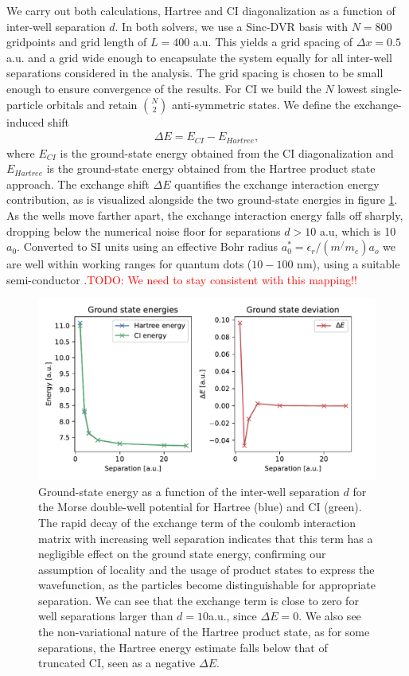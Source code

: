 \documentclass{subfiles}
\begin{document}
We carry out both calculations, Hartree and CI diagonalization as a function of inter-well separation $d$. In both solvers, we use a Sinc-DVR basis with $N=800$ gridpoints and  grid length of $L=400$ a.u. This yields a grid spacing of $\Delta x = 0.5$ a.u. and a grid wide enough to encapsulate the system equally for all inter-well separations considered in the analysis. The grid spacing is chosen to be small enough to ensure convergence of the results. For CI we build the $N$ lowest single-particle orbitals and retain $\binom{N}{2}$ anti-symmetric states. We define the exchange-induced shift
\begin{align*}
    \Delta E = E_{CI} - E_{Hartree},
\end{align*}
where $E_{CI}$ is the ground-state energy obtained from the CI diagonalization and $E_{Hartree}$ is the ground-state energy obtained from the Hartree product state approach. The exchange shift $\Delta E$ quantifies the exchange interaction energy contribution, as is visualized alongside the two ground-state energies in figure \ref{fig:exchange_shift}. As the wells move farther apart, the exchange interaction energy falls off sharply, dropping below the numerical noise floor for separations $d > 10$ a.u, which is 10 $a_0$. Converted to SI units using an effective Bohr radius $a_0^* = \epsilon_r/(m^/m_e)a_o$ we are well within working ranges for quantum dots ($10-100$ nm), using a suitable semi-conductor \cite{jacak2013quantum, garcia2021semiconductor}.\textcolor{red}{TODO: We need to stay consistent with this mapping!!}
\begin{figure}[h!]
    \centering
    \includegraphics[width=1.0\textwidth]{figs/exchange_shift.pdf}
    \caption{Ground-state energy as a function of the inter-well separation $d$ for the Morse double-well potential for Hartree (blue) and CI (green). The rapid decay of the exchange term of the coulomb interaction matrix with increasing well separation indicates that this term has a negligible effect on the ground state energy, confirming our assumption of locality and the usage of product states to express the wavefunction, as the particles become distinguishable for appropriate separation. We can see that the exchange term is close to zero for well separations larger than $d = 10$a.u., since $\Delta E=0$. We also see the non-variational nature of the Hartree product state, as for some separations, the Hartree energy estimate falls below that of truncated CI, seen as a negative $\Delta E$.}
    \label{fig:exchange_shift}
\end{figure}
\end{document}
